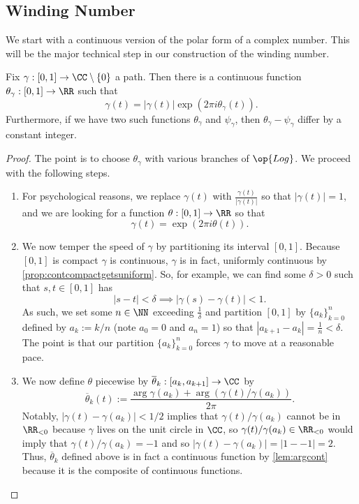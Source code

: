 \subsection{Winding Number}
We start with a continuous version of the polar form of a complex number. This will be the major technical step in our construction of the winding number.
\begin{lemma} \label{lem:byhandwinding}
	Fix $\gamma:[0,1]\to\CC\setminus\{0\}$ a path. Then there is a continuous function $\theta_\gamma:[0,1]\to\RR$ such that
	\[\gamma(t)=|\gamma(t)|\exp(2\pi i\theta_\gamma(t)).\]
	Furthermore, if we have two such functions $\theta_\gamma$ and $\psi_\gamma$, then $\theta_\gamma-\psi_\gamma$ differ by a constant integer.
\end{lemma}
\begin{proof}
	The point is to choose $\theta_\gamma$ with various branches of $\op{Log}$. We proceed with the following steps.
	\begin{enumerate}
		\item For psychological reasons, we replace $\gamma(t)$ with $\frac{\gamma(t)}{|\gamma(t)|}$ so that $\left|\gamma(t)\right|=1$, and we are looking for a function $\theta:[0,1]\to\RR$ so that
		\[\gamma(t)=\exp(2\pi i\theta(t)).\]
		\item We now temper the speed of $\gamma$ by partitioning its interval $[0,1]$. Because $[0,1]$ is compact $\gamma$ is continuous, $\gamma$ is in fact, uniformly continuous by \autoref{prop:contcompactgetsuniform}. So, for example, we can find some $\delta>0$ such that $s,t\in[0,1]$ has
		\[|s-t|<\delta\implies|\gamma(s)-\gamma(t)|<1.\]
		As such, we set some $n\in\NN$ exceeding $\frac1\delta$ and partition $[0,1]$ by $\{a_k\}_{k=0}^n$ defined by $a_k:=k/n$ (note $a_0=0$ and $a_n=1$) so that $|a_{k+1}-a_k|=\frac1n<\delta$. The point is that our partition $\{a_k\}_{k=0}^n$ forces $\gamma$ to move at a reasonable pace.
		\item We now define $\theta$ piecewise by $\overline\theta_k:[a_k,a_{k+1}]\to\CC$ by
		\[\overline\theta_k(t):=\frac{\arg\gamma(a_k)+\arg(\gamma(t)/\gamma(a_k))}{2\pi}.\]
		Notably, $|\gamma(t)-\gamma(a_k)|<1/2$ implies that $\gamma(t)/\gamma(a_k)$ cannot be in $\RR_{<0}$ because $\gamma$ lives on the unit circle in $\CC$, so $\gamma(t)/\gamma(a_k)\in\RR_{<0}$ would imply that $\gamma(t)/\gamma(a_k)=-1$ and so $|\gamma(t)-\gamma(a_k)|=|1--1|=2$. Thus, $\overline\theta_k$ defined above is in fact a continuous function by \autoref{lem:argcont} because it is the composite of continuous functions.


\end{enumerate}
\end{proof}

